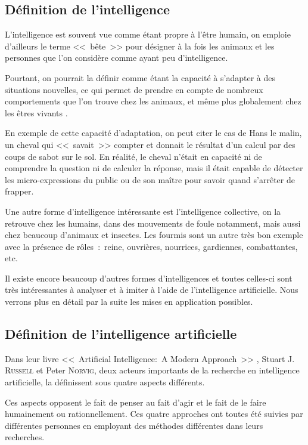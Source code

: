 
\subsection{Définition de l'intelligence}

L'intelligence est souvent vue comme étant propre à l'être humain, on emploie d'ailleurs le terme <<~bête~>> pour désigner à la fois les animaux et les personnes que l'on considère comme ayant peu d'intelligence.

Pourtant, on pourrait la définir comme étant la capacité à s'adapter à des situations nouvelles, ce qui permet de prendre en compte de nombreux comportements que l'on trouve chez les animaux, et même plus globalement chez les êtres vivants \cite{ia_pour_dev}.

En exemple de cette capacité d'adaptation, on peut citer le cas de Hans le malin, un cheval qui <<~savait~>> compter et donnait le résultat d'un calcul par des coups de sabot sur le sol.
En réalité, le cheval n'était en capacité ni de comprendre la question ni de calculer la réponse, mais il était capable de détecter les micro-expressions du public ou de son maître pour savoir quand s'arrêter de frapper.

Une autre forme d'intelligence intéressante est l'intelligence collective, on la retrouve chez les humains, dans des mouvements de foule notamment, mais aussi chez beaucoup d'animaux et insectes.
Les fourmis sont un autre très bon exemple avec la présence de rôles~:~reine, ouvrières, nourrices, gardiennes, combattantes, etc.

Il existe encore beaucoup d'autres formes d'intelligences et toutes celles-ci sont très intéressantes à analyser et à imiter à l'aide de l'intelligence artificielle.
Nous verrons plus en détail par la suite les mises en application possibles.

\subsection{Définition de l'intelligence artificielle}

Dans leur livre <<~Artificial Intelligence:~A Modern Approach~>> \cite{modern_approach}, Stuart J. \textsc{Russell} et Peter \textsc{Norvig}, deux acteurs importants de la recherche en intelligence artificielle, la définissent sous quatre aspects différents.

Ces aspects opposent le fait de penser au fait d'agir et le fait de le faire humainement ou rationnellement.
Ces quatre approches ont toutes été suivies par différentes personnes en employant des méthodes différentes dans leurs recherches.


